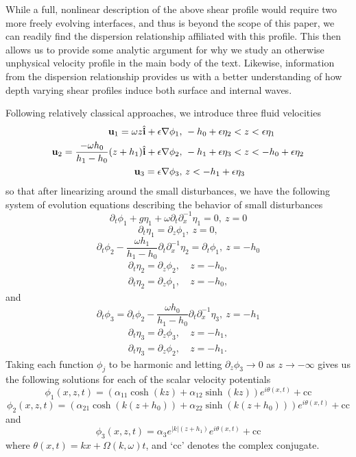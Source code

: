 \documentclass[a4paper,11pt]{article}
\newcommand{\pd}{\partial}
\begin{document}
While a full, nonlinear description of the above shear profile would require two more freely evolving interfaces, and thus is beyond the scope of this paper, we can readily find the dispersion relationship affiliated with this profile.  This then allows us to provide some analytic argument for why we study an otherwise unphysical velocity profile in the main body of the text.  Likewise, information from the dispersion relationship provides us with a better understanding of how depth varying shear profiles induce both surface and internal waves.

Following relatively classical approaches, we introduce three fluid velocities
\begin{align*}
{\bf u}_{1} = \omega z \hat{{\bf i}} + \epsilon \nabla \phi_{1}, &  ~-h_{0}+\epsilon \eta_{2} < z < \epsilon \eta_{1}\\
{\bf u}_{2} = \frac{-\omega h_{0}}{h_{1}-h_{0}} (z+h_{1}) \hat{{\bf i}} + \epsilon \nabla \phi_{2}, & ~-h_{1}+\epsilon \eta_{3} < z < -h_{0}+\epsilon \eta_{2}\\
{\bf u}_{3} = \epsilon \nabla \phi_{3}, & ~z < -h_{1} + \epsilon \eta_{3}
\end{align*}    
so that after linearizing around the small disturbances, we have the following system of evolution equations describing the behavior of small disturbances
\[
\pd_{t}\phi_{1} + g\eta_{1} + \omega \pd_{t}\pd_{x}^{-1}\eta_{1} = 0, ~ z = 0 
\]
\[
\pd_{t}\eta_{1} = \pd_{z}\phi_{1}, ~ z = 0, 
\]
\[
\pd_{t}\phi_{2} - \frac{\omega h_{1}}{h_{1}-h_{0}} \pd_{t}\pd_{x}^{-1}\eta_{2} = \pd_{t}\phi_{1} , ~ z = -h_{0} 
\]
\begin{align*}
\pd_{t}\eta_{2} = \pd_{z}\phi_{2}, & ~ z = -h_{0},\\
\pd_{t}\eta_{2} = \pd_{z}\phi_{1}, & ~ z = -h_{0}, 
\end{align*}
and
\[
\pd_{t}\phi_{3} = \pd_{t}\phi_{2} - \frac{\omega h_{0}}{h_{1}-h_{0}} \pd_{t}\pd_{x}^{-1}\eta_{3}, ~ z = -h_{1} 
\]
\begin{align*}
\pd_{t}\eta_{3} = \pd_{z}\phi_{3}, & ~ z = -h_{1},\\
\pd_{t}\eta_{3} = \pd_{z}\phi_{2}, & ~ z = -h_{1}. 
\end{align*}
Taking each function $\phi_{j}$ to be harmonic and letting $\pd_{z}\phi_{3}\rightarrow 0 $ as $z\rightarrow -\infty$ gives us the following solutions for each of the scalar velocity potentials
\[
\phi_{1}(x,z,t) = \left(\alpha_{11}\cosh(kz)+\alpha_{12}\sinh(kz)\right)e^{i\theta(x,t)} + \mbox{cc}
\]
\[
\phi_{2}(x,z,t) = \left(\alpha_{21}\cosh(k(z+h_{0}))+\alpha_{22}\sinh(k(z+h_{0}))\right)e^{i\theta(x,t)} + \mbox{cc}
\]
and
\[
\phi_{3}(x,z,t) = \alpha_{3}e^{|k|(z+h_{1})}e^{i\theta(x,t)} + \mbox{cc}
\]
where $\theta(x,t) = kx + \Omega(k,\omega)t$, and `cc' denotes the complex conjugate.  
\end{document}
